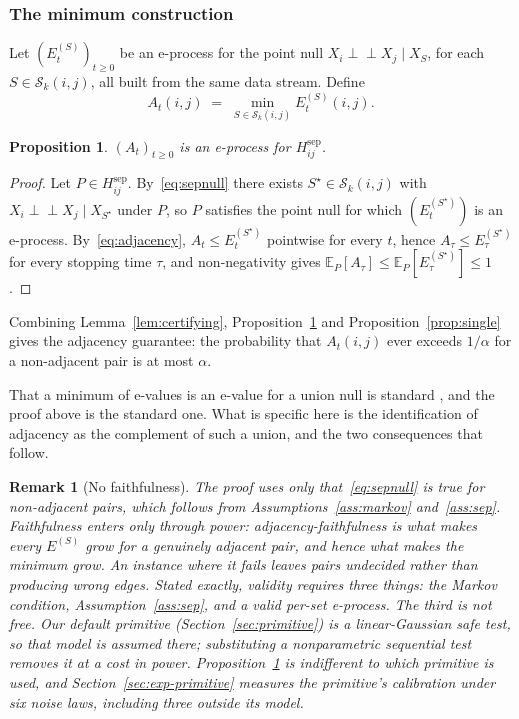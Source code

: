 \documentclass[pdflatex,sn-apa]{sn-jnl}
\theoremstyle{thmstyleone}%
\newtheorem{proposition}[theorem]{Proposition}%
\theoremstyle{thmstyletwo}%
\newtheorem{remark}{Remark}%
\theoremstyle{thmstylethree}%
\newcommand{\indep}{\perp\!\!\!\perp}
\newcommand{\Scal}{\mathcal{S}}
\newcommand{\Exp}{\mathbb{E}}
\begin{document}
\subsubsection{The minimum construction}\label{sec:minconstruction}

Let $(E^{(S)}_t)_{t \ge 0}$ be an e-process for the point null
$X_i \indep X_j \mid X_S$, for each $S \in \Scal_k(i,j)$, all built from the
same data stream. Define
\begin{equation}\label{eq:adjacency}
A_t(i,j) \;=\; \min_{S \in \Scal_k(i,j)} E^{(S)}_t(i,j) .
\end{equation}

\begin{proposition}\label{prop:adjacency}
$(A_t)_{t \ge 0}$ is an e-process for $H^{\mathrm{sep}}_{ij}$.
\end{proposition}

\begin{proof}
Let $P \in H^{\mathrm{sep}}_{ij}$. By~\eqref{eq:sepnull} there exists
$S^\star \in \Scal_k(i,j)$ with $X_i \indep X_j \mid X_{S^\star}$ under $P$,
so $P$ satisfies the point null for which $(E^{(S^\star)}_t)$ is an e-process.
By~\eqref{eq:adjacency}, $A_t \le E^{(S^\star)}_t$ pointwise for every $t$,
hence $A_\tau \le E^{(S^\star)}_\tau$ for every stopping time $\tau$, and
non-negativity gives
$\Exp_P[A_\tau] \le \Exp_P[E^{(S^\star)}_\tau] \le 1$.
\end{proof}

Combining Lemma~\ref{lem:certifying}, Proposition~\ref{prop:adjacency} and
Proposition~\ref{prop:single} gives the adjacency guarantee: the probability
that $A_t(i,j)$ ever exceeds $1/\alpha$ for a non-adjacent pair is at most
$\alpha$.

That a minimum of e-values is an e-value for a union null is standard
\citep{vovk2021evalues}, and the proof above is the standard one. What is
specific here is the identification of adjacency as the complement of such a
union, and the two consequences that follow.

\begin{remark}[No faithfulness]\label{rem:faithfulness}
The proof uses only that~\eqref{eq:sepnull} is true for non-adjacent pairs,
which follows from Assumptions~\ref{ass:markov} and~\ref{ass:sep}.
Faithfulness enters only through power: adjacency-faithfulness
\citep{ramsey2006adjacency} is what makes every $E^{(S)}$ grow for a genuinely
adjacent pair, and hence what makes the minimum grow. An instance where it
fails leaves pairs undecided rather than producing wrong edges. Stated
exactly, validity requires three things: the Markov condition,
Assumption~\ref{ass:sep}, and a valid per-set e-process. The third is not
free. Our default primitive (Section~\ref{sec:primitive}) is a linear-Gaussian
safe test, so that model is assumed \emph{there}; substituting a nonparametric
sequential test \citep{he2026sequential} removes it at a cost in power.
Proposition~\ref{prop:adjacency} is indifferent to which primitive is used,
and Section~\ref{sec:exp-primitive} measures the primitive's calibration under
six noise laws, including three outside its model.
\end{remark}
\end{document}
